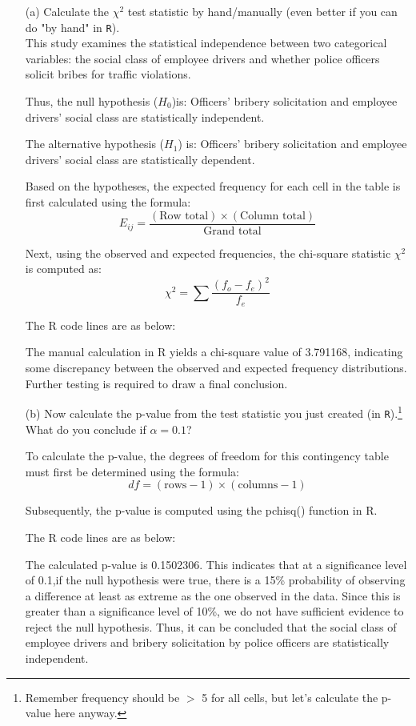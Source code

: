 \documentclass[12pt,letterpaper]{article}
\begin{document}
	\begin{enumerate}
		\item [(a)] Calculate the $\chi^2$ test statistic by hand/manually (even better if you can do "by hand" in \texttt{R}).\\
		This study examines the statistical independence between two categorical variables: the social class of employee drivers and whether police officers solicit bribes for traffic violations.
		
		Thus, the null hypothesis ($H_0$)is:
		Officers' bribery solicitation and employee drivers' social class are statistically independent.
		
		The alternative hypothesis ($H_1$) is:
		Officers' bribery solicitation and employee drivers' social class are statistically dependent.
		
		Based on the hypotheses, the expected frequency for each cell in the table is first calculated using the formula:
		\[
		E_{ij} = \frac{(\text{Row total}) \times (\text{Column total})}{\text{Grand total}}
		\]
		
		Next, using the observed and expected frequencies, the chi-square statistic $\chi^2$ is computed as:
		\[
		\chi^2 = \sum \frac{(f_o - f_e)^2}{f_e}
		\]
		
		The R code lines are as below:
		
		
		The manual calculation in R yields a chi-square value of 3.791168, indicating some discrepancy between the observed and expected frequency distributions. Further testing is required to draw a final conclusion.
		
		\item [(b)] Now calculate the p-value from the test statistic you just created (in \texttt{R}).\footnote{Remember frequency should be $>$ 5 for all cells, but let's calculate the p-value here anyway.} What do you conclude if $\alpha = 0.1$?
		
		To calculate the p-value, the degrees of freedom for this contingency table must first be determined using the formula:
		\[
		df = (\text{rows} - 1) \times (\text{columns} - 1)
		\]
		
		Subsequently, the p-value is computed using the pchisq() function in R.
		
		The R code lines are as below:
		
		
		The calculated p-value is 0.1502306. This indicates that at a significance level of 0.1,if the null hypothesis were true, there is a 15\% probability of observing a difference at least as extreme as the one observed in the data. Since this is greater than a significance level of 10\%, we do not have sufficient evidence to reject the null hypothesis. Thus, it can be concluded that the social class of employee drivers and bribery solicitation by police officers are statistically independent.
		

\end{enumerate}
\end{document}
